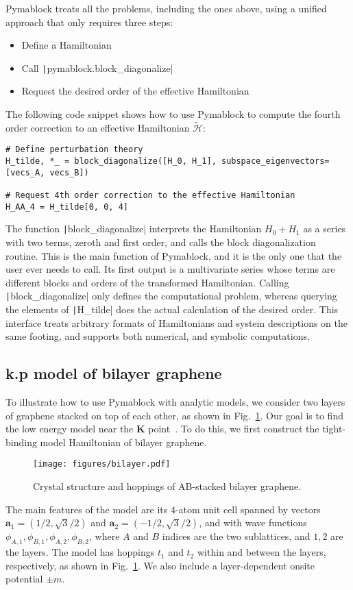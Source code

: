 Pymablock treats all the problems, including the ones above, using a unified approach that only requires three steps:
%
\begin{itemize}
\item Define a Hamiltonian
\item Call \texttt|pymablock.block_diagonalize|
\item Request the desired order of the effective Hamiltonian
\end{itemize}
%
The following code snippet shows how to use Pymablock to compute the fourth order correction to an effective Hamiltonian $\tilde{\mathcal{H}}$:
%
\begin{verbatim}
# Define perturbation theory
H_tilde, *_ = block_diagonalize([H_0, H_1], subspace_eigenvectors=[vecs_A, vecs_B])

# Request 4th order correction to the effective Hamiltonian
H_AA_4 = H_tilde[0, 0, 4]
\end{verbatim}
%
The function \texttt|block_diagonalize| interprets the Hamiltonian $H_0 + H_1$ as a series with two terms, zeroth and first order, and calls the block diagonalization routine.
This is the main function of Pymablock, and it is the only one that the user ever needs to call.
Its first output is a multivariate series whose terms are different blocks and orders of the transformed Hamiltonian.
Calling \texttt|block_diagonalize| only defines the computational problem, whereas querying the elements of \texttt|H_tilde| does the actual calculation of the desired order.
This interface treats arbitrary formats of Hamiltonians and system descriptions on the same footing, and supports both numerical, and symbolic computations.

\subsection{k.p model of bilayer graphene}
\label{sec:bilayer_graphene}

To illustrate how to use Pymablock with analytic models, we consider two layers of graphene stacked on top of each other, as shown in Fig.~\ref{fig:bilayer}.
Our goal is to find the low energy model near the $\mathbf{K}$ point~\cite{McCann_2013}.
To do this, we first construct the tight-binding model Hamiltonian of bilayer graphene.
%
\begin{figure}[!htbp]
\centering
\texttt{[image: figures/bilayer.pdf]}
\caption[]{Crystal structure and hoppings of AB-stacked bilayer graphene.}
\label{fig:bilayer}
\end{figure}
%
The main features of the model are its 4-atom unit cell spanned by vectors $\mathbf{a}_1 = (1/2, \sqrt{3}/2)$ and $\mathbf{a}_2=( -1/2, \sqrt{3}/2)$, and with wave functions $\phi_{A,1}, \phi_{B,1}, \phi_{A,2}, \phi_{B,2}$, where $A$ and $B$ indices are the two sublattices, and $1,2$ are the layers.
The model has hoppings $t_1$ and $t_2$ within and between the layers, respectively, as shown in Fig.~\ref{fig:bilayer}.
We also include a layer-dependent onsite potential $\pm m$.

